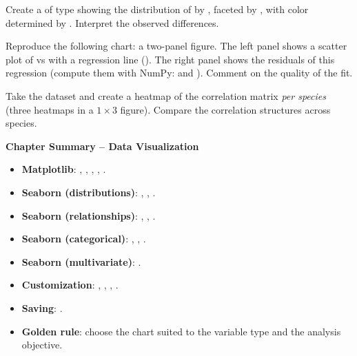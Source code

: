\begin{exercise}[$\star\star$]
Create a  of type  showing the distribution of  by , faceted by , with color determined by . Interpret the observed differences.
\end{exercise}

\begin{exercise}[$\star\star\star$]
Reproduce the following chart: a two-panel figure. The left panel shows a scatter plot of  vs  with a regression line (). The right panel shows the residuals of this regression (compute them with NumPy:  and ). Comment on the quality of the fit.
\end{exercise}

\begin{exercise}[$\star\star\star$]
Take the  dataset and create a heatmap of the correlation matrix \emph{per species} (three heatmaps in a $1 \times 3$ figure). Compare the correlation structures across species.
\end{exercise}

\begin{keyformulas}
\textbf{Chapter Summary -- Data Visualization}
\begin{itemize}
    \item \textbf{Matplotlib}: , , , , .
    \item \textbf{Seaborn (distributions)}: , , .
    \item \textbf{Seaborn (relationships)}: , , .
    \item \textbf{Seaborn (categorical)}: , , .
    \item \textbf{Seaborn (multivariate)}: .
    \item \textbf{Customization}: , , , .
    \item \textbf{Saving}: .
    \item \textbf{Golden rule}: choose the chart suited to the variable type and the analysis objective.
\end{itemize}
\end{keyformulas}
